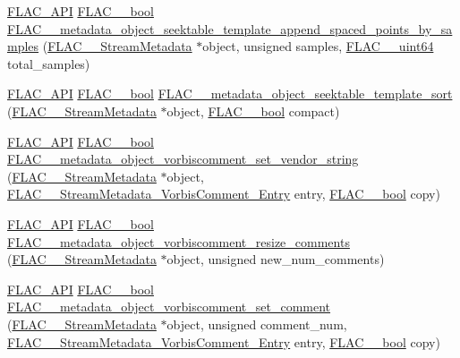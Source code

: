 \begin{DoxyCompactItemize}
\item 
\hyperlink{group__flac__export_ga56ca07df8a23310707732b1c0007d6f5}{F\+L\+A\+C\+\_\+\+A\+PI} \hyperlink{ordinals_8h_a95103469f1cbd78b8cf250194985b34e}{F\+L\+A\+C\+\_\+\+\_\+bool} \hyperlink{group__flac__metadata__object_gabf797b64b96808cabf1d995573680fe9}{F\+L\+A\+C\+\_\+\+\_\+metadata\+\_\+object\+\_\+seektable\+\_\+template\+\_\+append\+\_\+spaced\+\_\+points\+\_\+by\+\_\+samples} (\hyperlink{struct_f_l_a_c_____stream_metadata}{F\+L\+A\+C\+\_\+\+\_\+\+Stream\+Metadata} $\ast$object, unsigned samples, \hyperlink{ordinals_8h_aa78c8c70a3eb8a58af7436f278acde8e}{F\+L\+A\+C\+\_\+\+\_\+uint64} total\+\_\+samples)
\item 
\hyperlink{group__flac__export_ga56ca07df8a23310707732b1c0007d6f5}{F\+L\+A\+C\+\_\+\+A\+PI} \hyperlink{ordinals_8h_a95103469f1cbd78b8cf250194985b34e}{F\+L\+A\+C\+\_\+\+\_\+bool} \hyperlink{group__flac__metadata__object_gaee6a1f08321b56a3fa65af94dd7830cd}{F\+L\+A\+C\+\_\+\+\_\+metadata\+\_\+object\+\_\+seektable\+\_\+template\+\_\+sort} (\hyperlink{struct_f_l_a_c_____stream_metadata}{F\+L\+A\+C\+\_\+\+\_\+\+Stream\+Metadata} $\ast$object, \hyperlink{ordinals_8h_a95103469f1cbd78b8cf250194985b34e}{F\+L\+A\+C\+\_\+\+\_\+bool} compact)
\item 
\hyperlink{group__flac__export_ga56ca07df8a23310707732b1c0007d6f5}{F\+L\+A\+C\+\_\+\+A\+PI} \hyperlink{ordinals_8h_a95103469f1cbd78b8cf250194985b34e}{F\+L\+A\+C\+\_\+\+\_\+bool} \hyperlink{group__flac__metadata__object_gabfc6277c08a86329efd19572695b57e6}{F\+L\+A\+C\+\_\+\+\_\+metadata\+\_\+object\+\_\+vorbiscomment\+\_\+set\+\_\+vendor\+\_\+string} (\hyperlink{struct_f_l_a_c_____stream_metadata}{F\+L\+A\+C\+\_\+\+\_\+\+Stream\+Metadata} $\ast$object, \hyperlink{struct_f_l_a_c_____stream_metadata___vorbis_comment___entry}{F\+L\+A\+C\+\_\+\+\_\+\+Stream\+Metadata\+\_\+\+Vorbis\+Comment\+\_\+\+Entry} entry, \hyperlink{ordinals_8h_a95103469f1cbd78b8cf250194985b34e}{F\+L\+A\+C\+\_\+\+\_\+bool} copy)
\item 
\hyperlink{group__flac__export_ga56ca07df8a23310707732b1c0007d6f5}{F\+L\+A\+C\+\_\+\+A\+PI} \hyperlink{ordinals_8h_a95103469f1cbd78b8cf250194985b34e}{F\+L\+A\+C\+\_\+\+\_\+bool} \hyperlink{group__flac__metadata__object_ga264611f0af9b5e09d083c1ca5495f1c4}{F\+L\+A\+C\+\_\+\+\_\+metadata\+\_\+object\+\_\+vorbiscomment\+\_\+resize\+\_\+comments} (\hyperlink{struct_f_l_a_c_____stream_metadata}{F\+L\+A\+C\+\_\+\+\_\+\+Stream\+Metadata} $\ast$object, unsigned new\+\_\+num\+\_\+comments)
\item 
\hyperlink{group__flac__export_ga56ca07df8a23310707732b1c0007d6f5}{F\+L\+A\+C\+\_\+\+A\+PI} \hyperlink{ordinals_8h_a95103469f1cbd78b8cf250194985b34e}{F\+L\+A\+C\+\_\+\+\_\+bool} \hyperlink{group__flac__metadata__object_gadf034b2c385e7932c6be2d724a0deae3}{F\+L\+A\+C\+\_\+\+\_\+metadata\+\_\+object\+\_\+vorbiscomment\+\_\+set\+\_\+comment} (\hyperlink{struct_f_l_a_c_____stream_metadata}{F\+L\+A\+C\+\_\+\+\_\+\+Stream\+Metadata} $\ast$object, unsigned comment\+\_\+num, \hyperlink{struct_f_l_a_c_____stream_metadata___vorbis_comment___entry}{F\+L\+A\+C\+\_\+\+\_\+\+Stream\+Metadata\+\_\+\+Vorbis\+Comment\+\_\+\+Entry} entry, \hyperlink{ordinals_8h_a95103469f1cbd78b8cf250194985b34e}{F\+L\+A\+C\+\_\+\+\_\+bool} copy)

\end{DoxyCompactItemize}

